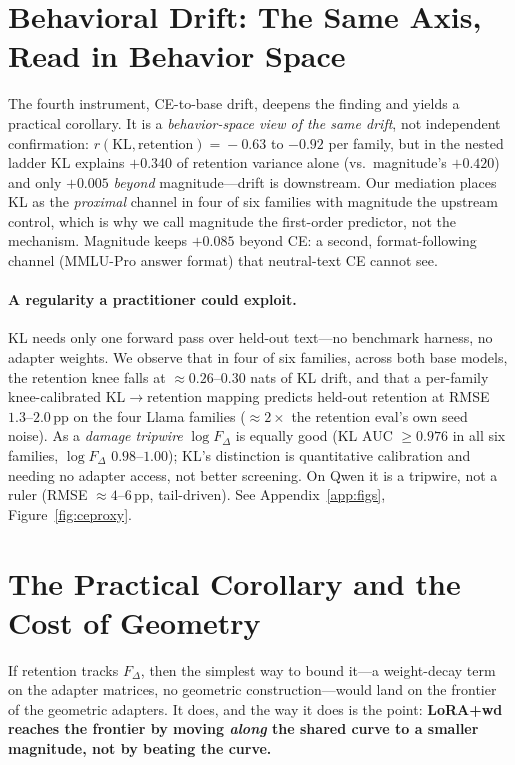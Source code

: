 \documentclass[11pt]{article}
\newcommand{\dw}{F_{\Delta}}
\begin{document}
\section{Behavioral Drift: The Same Axis, Read in Behavior Space}\label{sec:drift}
The fourth instrument, CE-to-base drift, deepens the finding and yields a
practical corollary. It is a \emph{behavior-space view of the same drift}, not
independent confirmation: $r(\text{KL},\text{retention})\!=\!-0.63$ to $-0.92$ per
family, but in the nested ladder KL explains $+0.340$ of retention variance alone
(vs.\ magnitude's $+0.420$) and only $+0.005$ \emph{beyond} magnitude---drift is
downstream. Our mediation places KL as the \emph{proximal} channel in four of six
families with magnitude the upstream control, which is why we call magnitude the
first-order predictor, not the mechanism. Magnitude keeps $+0.085$ beyond CE: a
second, format-following channel (MMLU-Pro answer format) that neutral-text CE
cannot see.

\paragraph{A regularity a practitioner could exploit.} KL needs only one forward
pass over held-out text---no benchmark harness, no adapter weights. We observe
that in four of six families, across both base models, the retention knee falls at
$\approx\!0.26$--$0.30$ nats of KL drift, and that a per-family knee-calibrated
KL$\rightarrow$retention mapping predicts held-out retention at RMSE
$1.3$--$2.0$\,pp on the four Llama families ($\approx\!2\times$ the retention
eval's own seed noise). As a \emph{damage tripwire} $\log\dw$ is equally good (KL
AUC $\ge\!0.976$ in all six families, $\log\dw$ $0.98$--$1.00$); KL's distinction
is quantitative calibration and needing no adapter access, not better screening. On
Qwen it is a tripwire, not a ruler (RMSE $\approx\!4$--$6$\,pp, tail-driven). See
Appendix~\ref{app:figs}, Figure~\ref{fig:ceproxy}.

\section{The Practical Corollary and the Cost of Geometry}\label{sec:corollary}

If retention tracks $\dw$, then the simplest way to bound it---a weight-decay term
on the adapter matrices, no geometric construction---would land on the frontier of
the geometric adapters. It does, and the way it does is the point: \textbf{LoRA{+}wd
reaches the frontier by moving \emph{along} the shared curve to a smaller
magnitude, not by beating the curve.}
\end{document}

